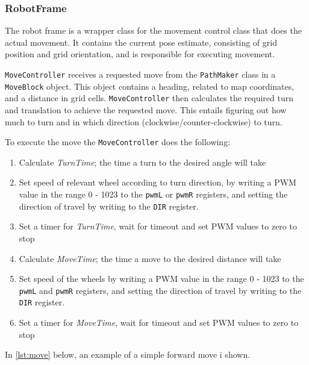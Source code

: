 \documentclass[Main]{subfiles}
\begin{document}
	\subsubsection{RobotFrame} %
	\label{subsub:software_robotframe}
	
	The robot frame is a wrapper class for the movement control class that does the actual movement.
	It contains the current pose estimate, consisting of grid position and grid orientation, and is responsible for executing movement.

	\texttt{MoveController} receives a requested move from the \texttt{PathMaker} class in a \texttt{MoveBlock} object.
	This object contains a heading, related to map coordinates, and a distance in grid cells.
	\texttt{MoveController} then calculates the required turn and translation to achieve the requested move.
	This entails figuring out how much to turn and in which direction (clockwise/counter-clockwise) to turn.

	\newpage
	To execute the move the \texttt{MoveController} does the following:
	\begin{enumerate}
		\item
		Calculate \emph{TurnTime}; the time a turn to the desired angle will take

		\item
		Set speed of relevant wheel according to turn direction, by writing a PWM value in the range 0 - 1023 to the \texttt{pwmL} or \texttt{pwmR} registers, and setting the direction of travel by writing to the \texttt{DIR} register.

		\item
		Set a timer for \emph{TurnTime}, wait for timeout and set PWM values to zero to stop

		\item
		Calculate \emph{MoveTime}; the time a move to the desired distance will take

		\item
		Set speed of the wheels by writing a PWM value in the range 0 - 1023 to the \texttt{pwmL} and \texttt{pwmR} registers, and setting the direction of travel by writing to the \texttt{DIR} register.

		\item
		Set a timer for \emph{MoveTime}, wait for timeout and set PWM values to zero to stop
	\end{enumerate}

	In \autoref{lst:move} below, an example of a simple forward move i shown.
\end{document}
